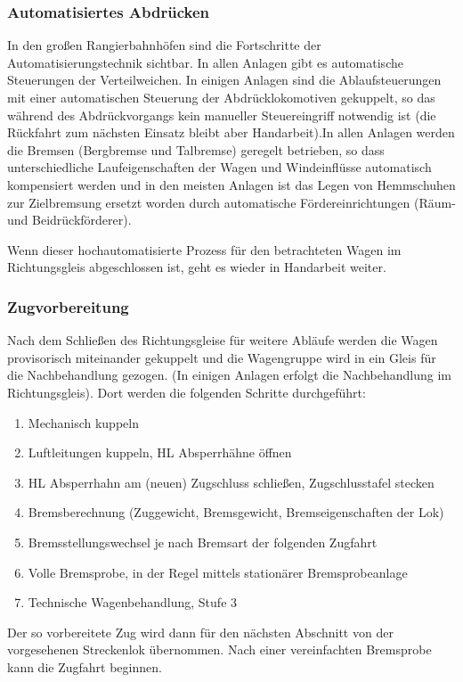 \subsubsection{Automatisiertes Abdrücken}\label{sec:automAbdruecken}
In den großen Rangierbahnhöfen sind die Fortschritte der Automatisierungstechnik sichtbar. In allen Anlagen gibt es automatische Steuerungen der Verteilweichen. In einigen Anlagen sind die Ablaufsteuerungen mit einer automatischen Steuerung der Abdrücklokomotiven gekuppelt, so das während des Abdrückvorgangs kein manueller Steuereingriff notwendig ist (die Rückfahrt zum nächsten Einsatz bleibt aber Handarbeit).In allen Anlagen werden die Bremsen (Bergbremse und Talbremse) geregelt betrieben, so dass unterschiedliche Laufeigenschaften der Wagen und Windeinflüsse automatisch kompensiert werden und in den meisten Anlagen ist das Legen von Hemmschuhen zur Zielbremsung ersetzt worden durch automatische Fördereinrichtungen (Räum- und Beidrückförderer).\par
Wenn dieser hochautomatisierte Prozess für den betrachteten Wagen im Richtungsgleis abgeschlossen ist, geht es wieder in Handarbeit weiter.
\subsubsection{Zugvorbereitung}\label{sec:Zugvorbereitung}
Nach dem Schließen des Richtungsgleise für weitere Abläufe werden die Wagen provisorisch miteinander gekuppelt und die Wagengruppe wird in ein Gleis für die Nachbehandlung gezogen. (In einigen Anlagen erfolgt die Nachbehandlung im Richtungsgleis). Dort werden die folgenden Schritte durchgeführt:
\begin{enumerate}
    \item Mechanisch kuppeln
    \item Luftleitungen kuppeln, \acrshort{HL} Absperrhähne öffnen
    \item \acrshort{HL} Absperrhahn am (neuen) \gls{Zugschluss} schließen, Zugschlusstafel stecken
    \item Bremsberechnung (Zuggewicht, Bremsgewicht, Bremseigenschaften der Lok)
    \item Bremsstellungswechsel je nach Bremsart der folgenden \gls{Zugfahrt}
    \item Volle \gls{Bremsprobe}, in der Regel mittels stationärer Bremsprobeanlage
    \item Technische Wagenbehandlung, Stufe 3
\end{enumerate}
Der so vorbereitete Zug wird dann für den nächsten Abschnitt von der vorgesehenen Streckenlok übernommen. Nach einer vereinfachten Bremsprobe kann die \gls{Zugfahrt} beginnen.\par
